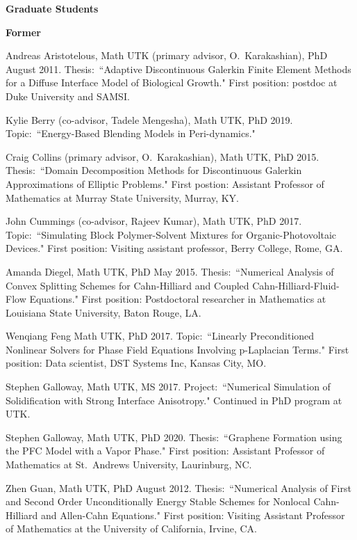 \documentclass[11pt]{letter}
\begin{document}
{\LARGE\bf  Graduate Students}
	\begin{description}
	\item
{\Large\bf Former}
	\begin{description}
	\item
Andreas Aristotelous, Math UTK (primary advisor, O.~Karakashian), PhD August 2011.  Thesis:~``Adaptive Discontinuous Galerkin Finite Element Methods for a Diffuse Interface Model of Biological Growth."  First position: postdoc at Duke University and SAMSI.
	\item
Kylie Berry (co-advisor, Tadele Mengesha), Math UTK, PhD 2019.  Topic:~``Energy-Based Blending Models in Peri-dynamics."
	\item
Craig Collins (primary advisor, O.~Karakashian), Math UTK, PhD 2015.  Thesis:~``Domain Decomposition Methods for Discontinuous Galerkin Approximations of Elliptic Problems." First postion: Assistant Professor of Mathematics at Murray State University, Murray, KY.
	\item
John Cummings (co-advisor, Rajeev Kumar), Math UTK, PhD 2017.  Topic:~``Simulating Block Polymer-Solvent Mixtures for Organic-Photovoltaic Devices." First position: Visiting assistant professor, Berry College, Rome, GA.
	\item
Amanda Diegel, Math UTK, PhD May 2015.  Thesis:~``Numerical Analysis of Convex Splitting Schemes for Cahn-Hilliard and Coupled Cahn-Hilliard-Fluid-Flow Equations." First position: Postdoctoral researcher in Mathematics at  Louisiana State University, Baton Rouge, LA.
	\item
Wenqiang Feng  Math UTK, PhD 2017.  Topic:~``Linearly Preconditioned Nonlinear Solvers for Phase Field Equations Involving p-Laplacian Terms." First position: Data scientist, DST Systems Inc, Kansas City, MO. 
	\item
Stephen Galloway, Math UTK, MS 2017.  Project:~``Numerical Simulation of Solidification with Strong Interface Anisotropy." Continued in PhD program at UTK.
	\item
Stephen Galloway, Math UTK, PhD 2020.  Thesis:~``Graphene Formation using the PFC Model with a Vapor Phase." First position: Assistant Professor of Mathematics at St.~Andrews University, Laurinburg, NC.
	\item
Zhen Guan, Math UTK, PhD August 2012.  Thesis:~``Numerical Analysis of First and Second Order Unconditionally Energy Stable Schemes for Nonlocal Cahn-Hilliard and Allen-Cahn Equations." First position: Visiting Assistant Professor of Mathematics at the University of California, Irvine, CA.


\end{description}
\end{description}
\end{document}
